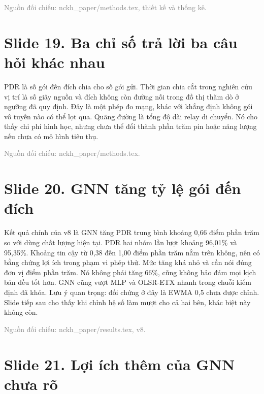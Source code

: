 {\small\textcolor{gray}{Nguồn đối chiếu: nckh\_paper/methods.tex, thiết kế và thống kê.}}




\section*{Slide 19. Ba chỉ số trả lời ba câu hỏi khác nhau}


PDR là số gói đến đích chia cho số gói gửi. Thời gian chia cắt trong nghiên cứu vị trí là số giây nguồn và đích không còn đường nối trong đồ thị thăm dò ở ngưỡng đã quy định. Đây là một phép đo mạng, khác với khẳng định không gói vô tuyến nào có thể lọt qua. Quãng đường là tổng độ dài relay di chuyển. Nó cho thấy chi phí hình học, nhưng chưa thể đổi thành phần trăm pin hoặc năng lượng nếu chưa có mô hình tiêu thụ.

{\small\textcolor{gray}{Nguồn đối chiếu: nckh\_paper/methods.tex.}}




\section*{Slide 20. GNN tăng tỷ lệ gói đến đích}


Kết quả chính của v8 là GNN tăng PDR trung bình khoảng 0,66 điểm phần trăm so với dùng chất lượng hiện tại. PDR hai nhóm lần lượt khoảng 96,01\% và 95,35\%. Khoảng tin cậy từ 0,38 đến 1,00 điểm phần trăm nằm trên không, nên có bằng chứng lợi ích trong phạm vi phép thử. Mức tăng khá nhỏ và cần nói đúng đơn vị điểm phần trăm. Nó không phải tăng 66\%, cũng không bảo đảm mọi kịch bản đều tốt hơn. GNN cũng vượt MLP và OLSR-ETX nhanh trong chuỗi kiểm định đã khóa. Lưu ý quan trọng: đối chứng ở đây là EWMA 0,5 chưa được chỉnh. Slide tiếp sau cho thấy khi chỉnh hệ số làm mượt cho cả hai bên, khác biệt này không còn.

{\small\textcolor{gray}{Nguồn đối chiếu: nckh\_paper/results.tex, v8.}}




\section*{Slide 21. Lợi ích thêm của GNN chưa rõ}

